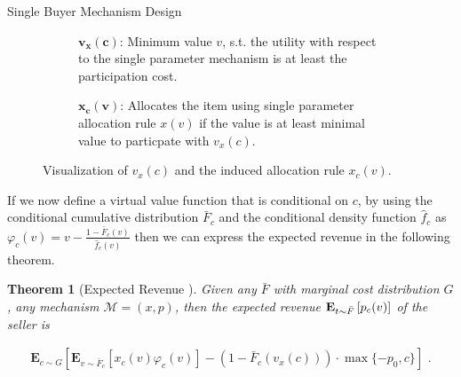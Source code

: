 \documentclass[11pt,a4paper]{article}
\newtheorem{theorem}{Theorem}
\newcommand{\Ex}[2][]{\mbox{\rm\bf E}_{#1}\left[#2\right]}
\newcommand{\1}[1]{\mbox{\rm\bf 1}_{#1}}
\newcommand{\eqdot}{\text{ .}}
\begin{document}
\begin{section}{Single Buyer Mechanism Design}
\begin{figure}[htp!]
\begin{subfigure}{.4\textwidth}
         \caption{
             $\mathbf{v_x(c)}$: Minimum value $v$, s.t. the utility with respect to the single parameter mechanism is at least the participation cost.
         }
     \end{subfigure}
     \begin{subfigure}{.4\textwidth}
         \centering
         \caption{
             $\mathbf{\mathbf{x_c(v)}}$: Allocates the item using single parameter allocation rule $x(v)$ if the value is at least minimal value to particpate with $v_x(c)$.
         }
     \end{subfigure}
     \caption{
         Visualization of $v_x(c)$ and the induced allocation rule $x_c(v)$.
     }
     \label{fig:visualization-of-induced-mechanism}
 \end{figure}

 If we now define a virtual value function that is conditional on $c$, by using the conditional cumulative distribution $\bar{F}_c$ and the conditional density function $\hat{f}_c$ as
 $\varphi_c(v) = v - \frac{1- \bar{F}_c(v)}{\hat{f}_c(v)}$ then we can express the expected revenue in the following theorem.

 \begin{theorem}[Expected Revenue \cite{primary}]
     \label{theorem:expected-revenue}
     Given any $\bar{F}$ with marginal cost distribution $G$, any mechanism $\mathcal{M}=(x,p)$, then the expected revenue $\Ex[t \sim \bar{F}]{p_c(v)}$ of the seller is

     \begin{align*}
         \mathbf{E}_{c \sim G}\left[\mathbf{E}_{v\sim\bar{F}_c}\left[x_c(v)\varphi_c(v)\right] - (1-\bar{F}_c(v_x(c))) \cdot \max\{-p_0,c\}\right] \eqdot
     \end{align*}
 \end{theorem}


\end{section}
\end{document}
